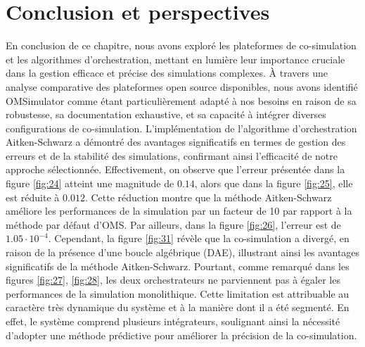 \section{Conclusion et perspectives}
En conclusion de ce chapitre, nous avons exploré les plateformes de co-simulation et les algorithmes d'orchestration, mettant en lumière leur importance cruciale dans la gestion efficace et précise des simulations complexes. À travers une analyse comparative des plateformes open source disponibles, nous avons identifié OMSimulator comme étant particulièrement adapté à nos besoins en raison de sa robustesse, sa documentation exhaustive, et sa capacité à intégrer diverses configurations de co-simulation. L'implémentation de l'algorithme d'orchestration Aitken-Schwarz a démontré des avantages significatifs en termes de gestion des erreurs et de la stabilité des simulations, confirmant ainsi l'efficacité de notre approche sélectionnée. Effectivement, on observe que l'erreur présentée dans la figure \ref{fig:24} atteint une magnitude de $0.14$, alors que dans la figure \ref{fig:25}, elle est réduite à $0.012$. Cette réduction montre que la méthode Aitken-Schwarz améliore les performances de la simulation par un facteur de 10 par rapport à la méthode par défaut d'OMS. Par ailleurs, dans la figure \ref{fig:26}, l'erreur est de $1.05\cdot 10^{-4}$. Cependant, la figure \ref{fig:31} révèle que la co-simulation a divergé, en raison de la présence d'une boucle algébrique (DAE), illustrant ainsi les avantages significatifs de la méthode Aitken-Schwarz. Pourtant, comme remarqué dans les figures \ref{fig:27}, \ref{fig:28}, les deux orchestrateurs ne parviennent pas à égaler les performances de la simulation monolithique. Cette limitation est attribuable au caractère très dynamique du système et à la manière dont il a été segmenté. En effet, le système comprend plusieurs intégrateurs, soulignant ainsi la nécessité d'adopter une méthode prédictive pour améliorer la précision de la co-simulation.